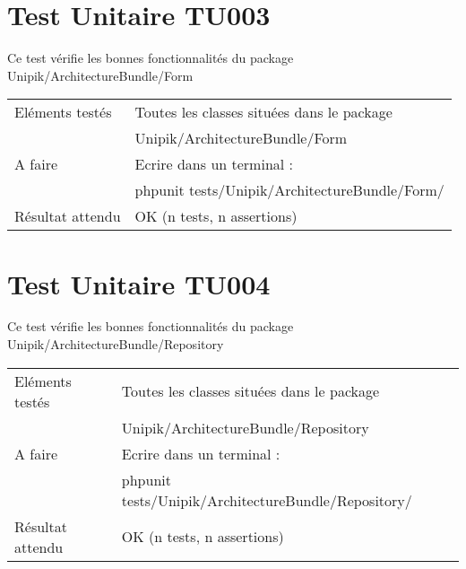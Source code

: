   		
  		
\section{Test Unitaire TU003}

		Ce test vérifie les bonnes fonctionnalités du package Unipik/ArchitectureBundle/Form \\
		
		
  		\begin{center}
    	 		\begin{tabular}[h]{|p{}|p{}|}
			\hline
				Eléments testés & Toutes les classes situées dans le package \\ 																& Unipik/ArchitectureBundle/Form \\\hline
    				A faire & Ecrire dans un terminal : \\ 
    						& phpunit tests/Unipik/ArchitectureBundle/Form/\\\hline
    				Résultat attendu & OK (n tests, n assertions) \\\hline
     		\end{tabular}
  		\end{center}	
  	
  		
\section{Test Unitaire TU004}

		Ce test vérifie les bonnes fonctionnalités du package Unipik/ArchitectureBundle/Repository \\
		
		
  		\begin{center}
    	 		\begin{tabular}[h]{|p{}|p{}|}
			\hline
				Eléments testés & Toutes les classes situées dans le package \\ 																& Unipik/ArchitectureBundle/Repository \\\hline
    				A faire & Ecrire dans un terminal : \\ 
    						& phpunit tests/Unipik/ArchitectureBundle/Repository/\\\hline
    				Résultat attendu & OK (n tests, n assertions) \\\hline
     		\end{tabular}
  		\end{center}	
  	


